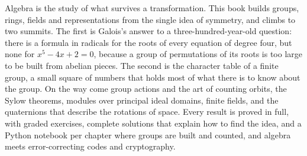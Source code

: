 Algebra is the study of what survives a transformation. This book builds groups, rings, fields and representations
from the single idea of symmetry, and climbs to two summits. The first is Galois's answer to a three-hundred-year-old
question: there is a formula in radicals for the roots of every equation of degree four, but none for
$x^5-4x+2=0$, because a group of permutations of its roots is too large to be built from abelian pieces. The second is
the character table of a finite group, a small square of numbers that holds most of what there is to know about the
group. On the way come group actions and the art of counting orbits, the Sylow theorems, modules over principal ideal
domains, finite fields, and the quaternions that describe the rotations of space. Every result is proved in full, with
graded exercises, complete solutions that explain how to find the idea, and a Python notebook per chapter where groups
are built and counted, and algebra meets error-correcting codes and cryptography.
